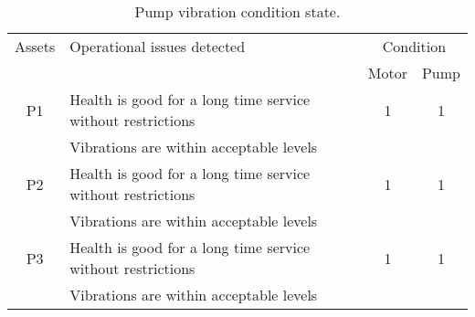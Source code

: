 \begin{table}[!h]
	\caption{Pump vibration condition state.}
	\label{ch045_tbl_vibration_data}
	{\footnotesize
\begin{tabular}{l|l|l|l}

\hline
\multicolumn{1}{c|}{Assets} & Operational issues detected & \multicolumn{2}{c}{Condition} \\ 
\cline{3-4}
\multicolumn{1}{c|}{} &  & \multicolumn{1}{c|}{Motor} & \multicolumn{1}{c}{Pump} \\ 
\hline
\multicolumn{1}{c|}{P1} & Health is good for a long time service without restrictions & \multicolumn{1}{c|}{1} & \multicolumn{1}{c}{1} \\
\multicolumn{1}{c|}{  } & Vibrations are within acceptable levels & \multicolumn{1}{c|}{} & \multicolumn{1}{c}{} \\  
\hline
\multicolumn{1}{c|}{P2} & Health is good for a long time service without restrictions & \multicolumn{1}{c|}{1} & \multicolumn{1}{c}{1} \\
\multicolumn{1}{c|}{  } & Vibrations are within acceptable levels & \multicolumn{1}{c|}{} & \multicolumn{1}{c}{} \\  
\hline
\multicolumn{1}{c|}{P3} & Health is good for a long time service without restrictions & \multicolumn{1}{c|}{1} & \multicolumn{1}{c}{1} \\
\multicolumn{1}{c|}{  } & Vibrations are within acceptable levels & \multicolumn{1}{c|}{} & \multicolumn{1}{c}{} \\  
\hline

\end{tabular}
	}
\end{table}